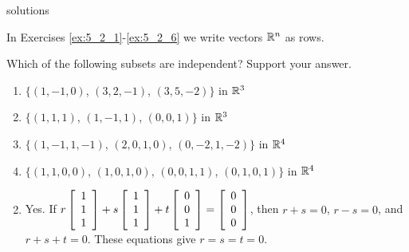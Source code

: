\begin{Filesave}{solutions}
\end{Filesave}

\begin{multicols}{2}
\noindent In Exercises \ref{ex:5_2_1}-\ref{ex:5_2_6} we write vectors $\mathbb{R}^n$ as rows.
\begin{ex}\label{ex:5_2_1}
Which of the following subsets are independent? Support your answer.

\begin{enumerate}[label={\alph*.}]
\item $\{(1, -1, 0)$, $(3, 2, -1)$, $(3, 5, -2)\}$ in $\mathbb{R}^3$

\item $\{(1, 1, 1)$, $(1, -1, 1)$, $(0, 0, 1)\}$ in $\mathbb{R}^3$

\item $\{(1, -1, 1, -1)$, $(2, 0, 1, 0)$, $(0, -2, 1, -2)\}$ in $\mathbb{R}^4$

\item $\{(1, 1, 0, 0)$, $(1, 0, 1, 0)$, $(0, 0, 1, 1)$, $(0, 1, 0, 1)\}$ in $\mathbb{R}^4$

\end{enumerate}
\begin{sol}
\begin{enumerate}[label={\alph*.}]
\setcounter{enumi}{1}
\item  Yes. If 
$r \left[ \begin{array}{r}
1 \\
1 \\
1
\end{array} \right]
+ s
\left[ \begin{array}{r}
1 \\
1 \\
1
\end{array} \right]
+ t
\left[ \begin{array}{r}
0 \\
0 \\
1
\end{array} \right]
=
\left[ \begin{array}{r}
0 \\
0 \\
0
\end{array} \right]$, then $r + s = 0$, $r - s = 0$, and $r + s + t = 0$. These equations give $r = s = t = 0$.


\end{enumerate}
\end{sol}
\end{ex}
\end{multicols}
